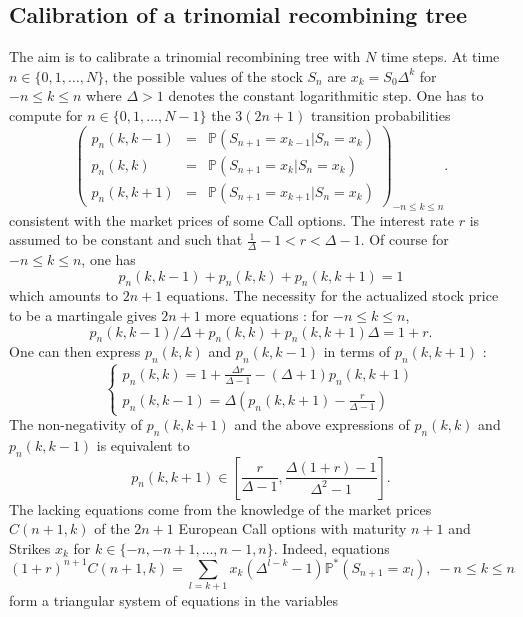 \documentclass[11pt]{article}
\begin{document}
\subsection*{Calibration of a trinomial recombining tree}
The aim is to calibrate a trinomial recombining tree with $N$ time
steps. At time $n\in\{0,1,\hdots,N\}$, the possible values of the stock $S_n$ are
$x_k=S_0\Delta^k$ for $-n\leq k\leq n$ where $\Delta>1$ denotes the
constant logarithmitic step. One has to compute for
$n\in\{0,1,\hdots,N-1\}$ the $3(2n+1)$ transition
probabilities $$\left(\begin{array}{ccc}p_n(k,k-1)&=&{\mathbb
  P}(S_{n+1}=x_{k-1}|S_n=x_k)\\p_n(k,k)&=&{\mathbb
  P}(S_{n+1}=x_{k}|S_n=x_k)\\ p_n(k,k+1)&=&{\mathbb
  P}(S_{n+1}=x_{k+1}|S_n=x_k)\end{array}\right)_{-n\leq k\leq n}.$$
consistent with the market prices of some
Call options. The interest rate $r$ is assumed to be
constant and such that $\frac{1}{\Delta}-1<r<\Delta -1$. Of course for $-n\leq k\leq n$, one has
$$p_n(k,k-1)+p_n(k,k)+ p_n(k,k+1)=1$$
which amounts to $2n+1$ equations. The
necessity for the actualized stock price to be a martingale gives $2n+1$
more equations : for $-n\leq k\leq n$,
$$p_n(k,k-1)/\Delta+p_n(k,k)+p_n(k,k+1)\Delta=1+r.$$
One can then express $p_n(k,k)$ and $p_n(k,k-1)$ in terms of
$p_n(k,k+1)$ :
\begin{equation}
\begin{cases}p_n(k,k)=1+\frac{\Delta r}{\Delta -1}-(\Delta +1)p_n(k,k+1)\\
      p_n(k,k-1)=\Delta\left(p_n(k,k+1)-\frac{r}{\Delta -1}\right)
   \end{cases}
\label{eq1}\end{equation}
The non-negativity of $p_n(k,k+1)$ and the above expressions of
$p_n(k,k)$ and $p_n(k,k-1)$ is equivalent to \begin{equation}
  p_n(k,k+1)\in\left[\frac{r}{\Delta -1},\frac{\Delta(1+r)-1}{\Delta^2-1}\right]\label{condprob}.\end{equation}
The lacking equations come from the knowledge of the market prices
$C(n+1,k)$ of the $2n+1$ European Call options with maturity $n+1$ and
Strikes $x_k$ for $k\in\{-n,-n+1,\hdots,n-1,n\}$. Indeed, equations 
\begin{equation}
   (1+r)^{n+1}C(n+1,k)=\sum_{l=k+1}x_k(\Delta^{l-k}-1){\mathbb P}^*(S_{n+1}=x_l),\;-n\leq
k\leq n\label{prixcall}
\end{equation} form a triangular system of equations in the variables
\end{document}
